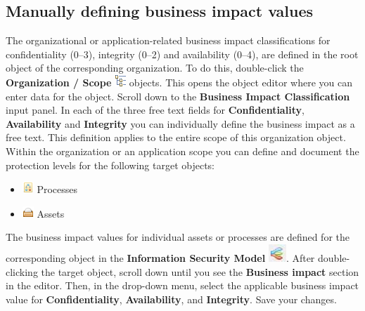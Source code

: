 \documentclass[a4paper,10pt]{book}
\begin{document}
\subsection{Manually defining business impact values}

The organizational or application-related business impact classifications for
confidentiality (0--3), integrity (0--2) and availability (0--4), are defined in
the root object of the corresponding organization. To do this, double-click the
\textbf{Organization / Scope} \includegraphics[height=2ex]{Icon/GS_Modell.png}
objects. This opens the object editor where you can enter data for the object.
Scroll down to the \textbf{Business Impact Classification} input panel. In each
of the three free text fields for \textbf{Confidentiality},
\textbf{Availability} and \textbf{Integrity} you can individually define the
business impact as a free text. This definition applies to the entire scope of
this organization object. Within the organization or an application scope you
can define and document the protection levels for the following target objects:

\begin{itemize}
\item \includegraphics[height=2ex]{Icon/Prozesse.png} Processes
\item \includegraphics[height=2ex]{Icon/Asset.png} Assets
\end{itemize}

The business impact values for individual assets or processes are
defined for the corresponding object in the \textbf{Information Security Model}
\includegraphics[height=2ex]{Icon/Informationssicherheitsmodell.png}. After
double-clicking the target object, scroll down until you see the
\textbf{Business impact} section in the editor. Then, in the drop-down menu,
select the applicable business impact value for \textbf{Confidentiality},
\textbf{Availability}, and \textbf{Integrity}. Save your changes.
\end{document}
